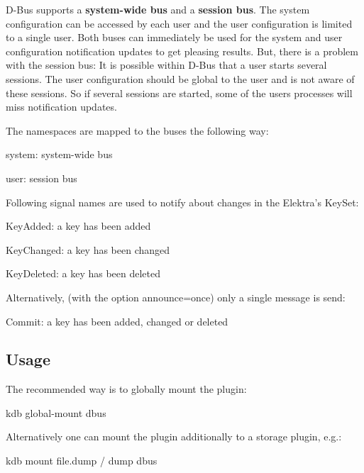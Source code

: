 D-\/\+Bus supports a {\bfseries system-\/wide bus} and a {\bfseries session bus}. The system configuration can be accessed by each user and the user configuration is limited to a single user. Both buses can immediately be used for the system and user configuration notification updates to get pleasing results. But, there is a problem with the session bus\+: It is possible within D-\/\+Bus that a user starts several sessions. The user configuration should be global to the user and is not aware of these sessions. So if several sessions are started, some of the user\textquotesingle{}s processes will miss notification updates.

The namespaces are mapped to the buses the following way\+:


\begin{DoxyItemize}
\item system\+: system-\/wide bus
\item user\+: session bus
\end{DoxyItemize}

Following signal names are used to notify about changes in the Elektra’s Key\+Set\+:


\begin{DoxyItemize}
\item Key\+Added\+: a key has been added
\item Key\+Changed\+: a key has been changed
\item Key\+Deleted\+: a key has been deleted
\end{DoxyItemize}

Alternatively, (with the option announce=once) only a single message is send\+:


\begin{DoxyItemize}
\item Commit\+: a key has been added, changed or deleted
\end{DoxyItemize}

\subsection*{Usage}

The recommended way is to globally mount the plugin\+: \begin{DoxyVerb}    kdb global-mount dbus
\end{DoxyVerb}


Alternatively one can mount the plugin additionally to a storage plugin, e.\+g.\+: \begin{DoxyVerb}    kdb mount file.dump / dump dbus
\end{DoxyVerb}


